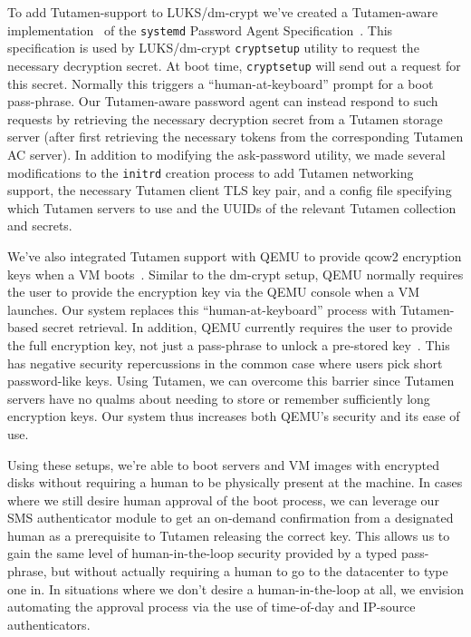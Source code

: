 To add Tutamen-support to LUKS/dm-crypt we've created a Tutamen-aware
implementation~\cite{src-tutamen-askpassword} of the \texttt{systemd}
Password Agent Specification~\cite{systemd-passwordagents}. This
specification is used by LUKS/dm-crypt \texttt{cryptsetup} utility to
request the necessary decryption secret. At boot time,
\texttt{cryptsetup} will send out a request for this secret. Normally
this triggers a ``human-at-keyboard'' prompt for a boot
pass-phrase. Our Tutamen-aware password agent can instead respond to
such requests by retrieving the necessary decryption secret from a
Tutamen storage server (after first retrieving the necessary tokens
from the corresponding Tutamen AC server). In addition to modifying
the ask-password utility, we made several modifications to the
\texttt{initrd} creation process to add Tutamen networking support,
the necessary Tutamen client TLS key pair, and a config file
specifying which Tutamen servers to use and the UUIDs of the relevant
Tutamen collection and secrets.

We've also integrated Tutamen support with QEMU to provide qcow2
encryption keys when a VM boots~\cite{src-qemu-tutamen}. Similar to
the dm-crypt setup, QEMU normally requires the user to provide the
encryption key via the QEMU console when a VM launches. Our system
replaces this ``human-at-keyboard'' process with Tutamen-based secret
retrieval. In addition, QEMU currently requires the user to provide
the full encryption key, not just a pass-phrase to unlock a pre-stored
key~\cite{berrange-qemucrypto}. This has negative security
repercussions in the common case where users pick short password-like
keys. Using Tutamen, we can overcome this barrier since Tutamen
servers have no qualms about needing to store or remember sufficiently
long encryption keys. Our system thus increases both QEMU's security
and its ease of use.

Using these setups, we're able to boot servers and VM images with
encrypted disks without requiring a human to be physically present at
the machine. In cases where we still desire human approval of the boot
process, we can leverage our SMS authenticator module to get an
on-demand confirmation from a designated human as a prerequisite to
Tutamen releasing the correct key. This allows us to gain the same
level of human-in-the-loop security provided by a typed pass-phrase,
but without actually requiring a human to go to the datacenter to type
one in. In situations where we don't desire a human-in-the-loop at
all, we envision automating the approval process via the use of
time-of-day and IP-source authenticators.

